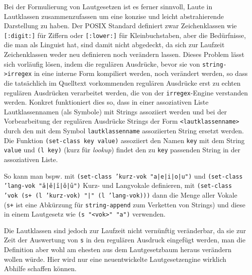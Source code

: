 \documentclass[12pt,a4paper,normalheadings]{scrartcl}
\def\tt#1{\texttt{#1}}
\begin{document}
Bei der Formulierung von Lautgesetzen ist es ferner sinnvoll,
Laute in Lautklassen zusammenzufassen um eine konzise
und leicht abstrahierende Darstellung zu haben.
Der POSIX Standard definiert zwar Zeichenklassen wie \tt{[:digit:]}
für Ziffern oder \tt{[:lower:]} für Kleinbuchstaben,
aber die Bedürfnisse, die man als Linguist hat,
sind damit nicht abgedeckt,
da sich zur Laufzeit Zeichenklassen weder neu definieren noch verändern lassen.
Dieses Problem lässt sich vorläufig lösen,
indem die regulären Ausdrücke,
bevor sie von \tt{string->irregex} in eine interne Form kompiliert werden,
noch verändert werden,
so dass die tatsächlich im Quelltext vorkommenden regulären Ausdrücke
erst zu echten regulären Ausdrücken verarbeitet werden,
die von der \tt{irregex}-Engine verstanden werden.
Konkret funktioniert dies so,
dass in einer assoziativen Liste Lautklassennamen (als Symbole)
mit Strings assoziiert werden
und bei der Vorbearbeitung der regulären Ausdrücke
Strings der Form \tt{<lautklassenname>} durch den mit dem Symbol
\tt{lautklassenname} assoziierten String ersetzt werden.
Die Funktion \tt{(set-class key value)} assoziiert den Namen \tt{key}
mit dem String \tt{value} und \tt{(l key)} (kurz für \emph{lookup})
findet den zu \tt{key} passenden String in der assoziativen Liste.

So kann man bspw. mit \tt{(set-class 'kurz-vok "a|e|i|o|u")} und
\tt{(set-class 'lang-vok "ā|ē|ī|ō|ū")} Kurz- und Langvokale definieren,
mit \tt{(set-class 'vok (s+ (l 'kurz-vok) "|" (l 'lang-vok)))} dann die Menge
aller Vokale
(\tt{s+} ist eine Abkürzung für \tt{string-append} zum Verketten von Strings)
und diese in einem Lautgesetz wie \tt{(s "<vok>" "a")} verwenden.

Die Lautklassen sind jedoch zur Laufzeit nicht vernünftig veränderbar,
da sie zur Zeit der Auswertung von \tt{s} in den regulären Ausdruck
eingefügt werden,
man die Definition aber wohl am ehesten aus dem Lautgesetzbaum heraus
verändern wollen würde.
Hier wird nur eine neuentwickelte Lautgesetzengine wirklich
Abhilfe schaffen können.
\end{document}
